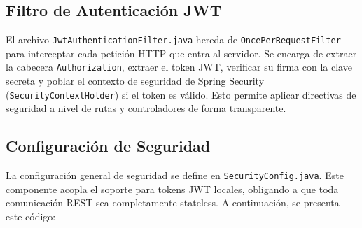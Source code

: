 \documentclass[12pt,letterpaper]{article}
\begin{document}
\subsection{Filtro de Autenticación JWT}
El archivo \texttt{JwtAuthenticationFilter.java} hereda de \texttt{OncePerRequestFilter} para interceptar cada petición HTTP que entra al servidor. Se encarga de extraer la cabecera \texttt{Authorization}, extraer el token JWT, verificar su firma con la clave secreta y poblar el contexto de seguridad de Spring Security (\texttt{SecurityContextHolder}) si el token es válido. Esto permite aplicar directivas de seguridad a nivel de rutas y controladores de forma transparente.

\subsection{Configuración de Seguridad}
La configuración general de seguridad se define en \texttt{SecurityConfig.java}. Este componente acopla el soporte para tokens JWT locales, obligando a que toda comunicación REST sea completamente stateless. A continuación, se presenta este código:
\end{document}
